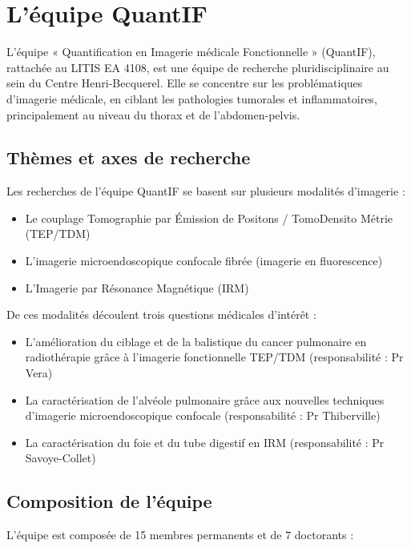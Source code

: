 \documentclass[11pt,a4paper]{report}
\begin{document}
\section{L'équipe QuantIF}

L'équipe « Quantification en Imagerie médicale Fonctionnelle » (QuantIF), rattachée au LITIS EA 4108, est une équipe de recherche pluridisciplinaire au sein du Centre Henri-Becquerel. Elle se concentre sur les problématiques d'imagerie médicale, en ciblant les pathologies tumorales et inflammatoires, principalement au niveau du thorax et de l'abdomen-pelvis.

\subsection{Thèmes et axes de recherche}

Les recherches de l'équipe QuantIF se basent sur plusieurs modalités d'imagerie :

\begin{itemize}
\item Le couplage Tomographie par Émission de Positons / TomoDensito Métrie (TEP/TDM)
\item L'imagerie microendoscopique confocale fibrée (imagerie en fluorescence)
\item L'Imagerie par Résonance Magnétique (IRM)
\end{itemize}

De ces modalités découlent trois questions médicales d'intérêt :

\begin{itemize}
\item L'amélioration du ciblage et de la balistique du cancer pulmonaire en radiothérapie grâce à l'imagerie fonctionnelle TEP/TDM (responsabilité : Pr Vera)
\item La caractérisation de l'alvéole pulmonaire grâce aux nouvelles techniques d'imagerie microendoscopique confocale (responsabilité : Pr Thiberville)
\item La caractérisation du foie et du tube digestif en IRM (responsabilité : Pr Savoye-Collet)
\end{itemize}

\subsection{Composition de l'équipe}

L'équipe est composée de 15 membres permanents et de 7 doctorants :
\end{document}
